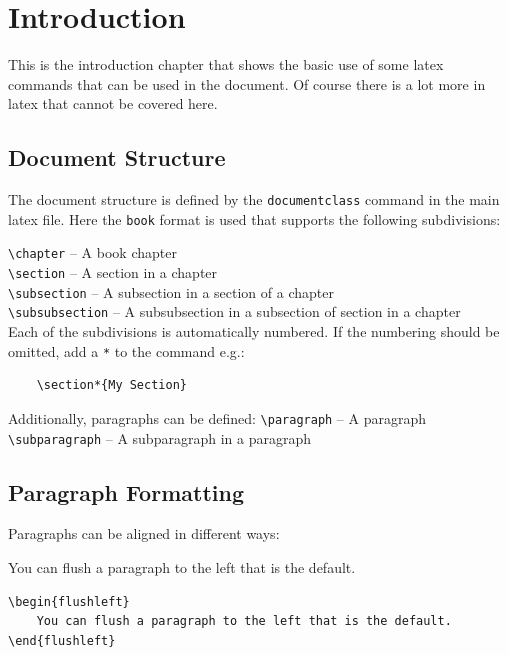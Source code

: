 \chapter{Introduction}

This is the introduction chapter that shows the basic use of some latex commands that can be used in the document. Of course there is a lot more in latex that cannot be covered here.


\section{Document Structure}
The document structure is defined by the \texttt{documentclass} command in the main latex file. Here the \texttt{book} format is used that supports the following subdivisions:

\texttt{\textbackslash chapter} -- A book chapter\\
\texttt{\textbackslash section} -- A section in a chapter\\
\texttt{\textbackslash subsection} -- A subsection in a section of a chapter\\
\texttt{\textbackslash subsubsection} -- A subsubsection in a subsection of section in a chapter\\

Each of the subdivisions is automatically numbered. If the numbering should be omitted, add a \texttt{*} to the command e.g.:
\begin{verbatim}
    \section*{My Section}
\end{verbatim}

Additionally, paragraphs can be defined:
\texttt{\textbackslash paragraph} -- A paragraph\\
\texttt{\textbackslash subparagraph} -- A subparagraph in a paragraph\\



\section{Paragraph Formatting}

Paragraphs can be aligned in different ways:

\begin{flushleft}
    You can flush a paragraph to the left that is the default.
\end{flushleft}
\begin{verbatim}
\begin{flushleft}
    You can flush a paragraph to the left that is the default.
\end{flushleft}
\end{verbatim}

